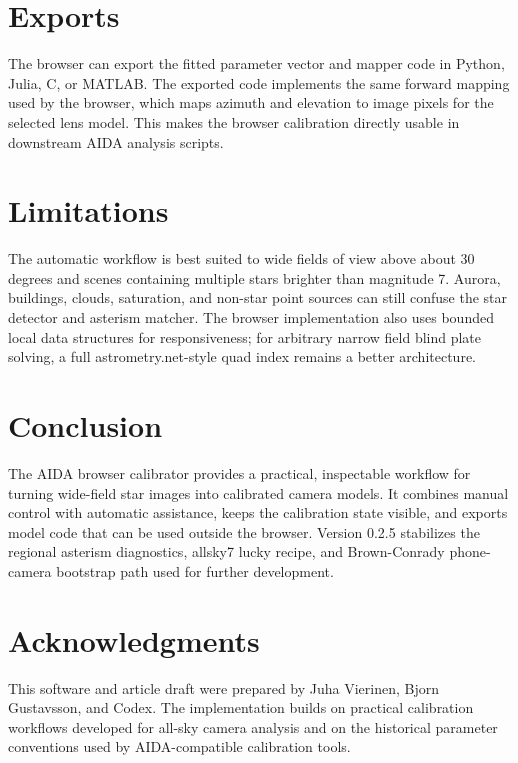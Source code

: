 \documentclass[11pt]{article}
\begin{document}
\section{Exports}

The browser can export the fitted parameter vector and mapper code in Python,
Julia, C, or MATLAB. The exported code implements the same forward mapping used
by the browser, which maps azimuth and elevation to image pixels for the
selected lens model. This makes the browser calibration directly usable in
downstream AIDA analysis scripts.

\section{Limitations}

The automatic workflow is best suited to wide fields of view above about
30 degrees and scenes containing multiple stars brighter than magnitude 7.
Aurora, buildings, clouds, saturation, and non-star point sources can still
confuse the star detector and asterism matcher. The browser implementation also
uses bounded local data structures for responsiveness; for arbitrary narrow
field blind plate solving, a full astrometry.net-style quad index remains a
better architecture.

\section{Conclusion}

The AIDA browser calibrator provides a practical, inspectable workflow for
turning wide-field star images into calibrated camera models. It combines
manual control with automatic assistance, keeps the calibration state visible,
and exports model code that can be used outside the browser. Version 0.2.5
stabilizes the regional asterism diagnostics, allsky7 lucky recipe, and
Brown-Conrady phone-camera bootstrap path used for further development.

\section*{Acknowledgments}

This software and article draft were prepared by Juha Vierinen, Bjorn
Gustavsson, and Codex. The implementation builds on practical calibration
workflows developed for all-sky camera analysis and on the historical parameter
conventions used by AIDA-compatible calibration tools.
\end{document}
